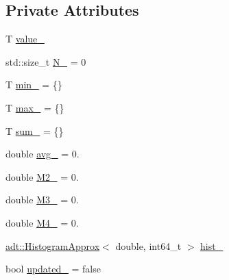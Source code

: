 \subsection*{Private Attributes}
\begin{DoxyCompactItemize}
\item 
T \hyperlink{structvt_1_1runtime_1_1component_1_1detail_1_1_diagnostic_value_wrapper_a0c675d645decffc3484ce8ab75a18f8b}{value\+\_\+}
\item 
std\+::size\+\_\+t \hyperlink{structvt_1_1runtime_1_1component_1_1detail_1_1_diagnostic_value_wrapper_a8055733259d06927a4c3e02e0d1649e4}{N\+\_\+} = 0
\item 
T \hyperlink{structvt_1_1runtime_1_1component_1_1detail_1_1_diagnostic_value_wrapper_ab68e4198cf0512a06af2e75d0a4837a4}{min\+\_\+} = \{\}
\item 
T \hyperlink{structvt_1_1runtime_1_1component_1_1detail_1_1_diagnostic_value_wrapper_a2db654ff7822440abfe2ef0b1dd1958a}{max\+\_\+} = \{\}
\item 
T \hyperlink{structvt_1_1runtime_1_1component_1_1detail_1_1_diagnostic_value_wrapper_afc3afcf348de09544bf109097224b7eb}{sum\+\_\+} = \{\}
\item 
double \hyperlink{structvt_1_1runtime_1_1component_1_1detail_1_1_diagnostic_value_wrapper_af43c732f760bdc64bb3d893e3aa900b6}{avg\+\_\+} = 0.
\item 
double \hyperlink{structvt_1_1runtime_1_1component_1_1detail_1_1_diagnostic_value_wrapper_af76d6679a75ff42618eabd6ae844e18e}{M2\+\_\+} = 0.
\item 
double \hyperlink{structvt_1_1runtime_1_1component_1_1detail_1_1_diagnostic_value_wrapper_a53e9c5563eb7a716f755536de3cc410d}{M3\+\_\+} = 0.
\item 
double \hyperlink{structvt_1_1runtime_1_1component_1_1detail_1_1_diagnostic_value_wrapper_af7e886c6de25a8dfe72eb607bcd61d11}{M4\+\_\+} = 0.
\item 
\hyperlink{namespacevt_1_1adt_a486971e142bc22434d6afe695c43b599}{adt\+::\+Histogram\+Approx}$<$ double, int64\+\_\+t $>$ \hyperlink{structvt_1_1runtime_1_1component_1_1detail_1_1_diagnostic_value_wrapper_af507930d714b3665233a19ef93fc6d32}{hist\+\_\+}
\item 
bool \hyperlink{structvt_1_1runtime_1_1component_1_1detail_1_1_diagnostic_value_wrapper_a4b844fd84acb8f1e1f9b2055f2f7b8bf}{updated\+\_\+} = false
\end{DoxyCompactItemize}
